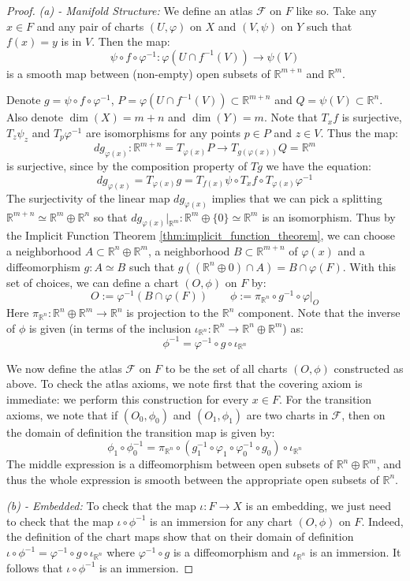 \documentclass[12pt]{article}
\theoremstyle{definition}
\numberwithin{equation}{section}
\newcommand{\R}{{\mathbb R}}
\newcommand{\op}{\operatorname}
\begin{document}
\begin{proof} \emph{(a) - Manifold Structure:} We define an atlas $\mathcal{F}$ on $F$ like so. Take any $x \in F$ and any pair of charts $(U,\varphi)$ on $X$ and $(V,\psi)$ on $Y$ such that $f(x) = y$ is in $V$. Then the map:
\[\psi \circ f \circ \varphi^{-1}:\varphi(U \cap f^{-1}(V)) \to \psi(V)\]
is a smooth map between (non-empty) open subsets of $\R^{m + n}$ and $\R^m$. 

Denote $g = \psi \circ f \circ \varphi^{-1}$, $P = \varphi(U \cap f^{-1}(V)) \subset \R^{m+n}$ and $Q = \psi(V) \subset \R^n$. Also denote $\op{dim}(X) = m + n$ and  $\op{dim}(Y) = m$. Note that $T_xf$ is surjective, $T_z\psi_z$ and $T_p\varphi^{-1}$ are isomorphisms for any points $p \in P$ and $z \in V$. Thus the map:
\[dg_{\varphi(x)}:\R^{m + n} = T_{\varphi(x)}P \to T_{g(\varphi(x))}Q = \R^m\]
is surjective, since by the composition property of $Tg$ we have the equation:
\[dg_{\varphi(x)} = T_{\varphi(x)}g = T_{f(x)}\psi \circ T_xf \circ T_{\varphi(x)}\varphi^{-1}\]
 The surjectivity of the linear map $dg_{\varphi(x)}$ implies that we can pick a splitting $\R^{m+n} \simeq \R^{m} \oplus \R^{n}$ so that $dg_{\varphi(x)}|_{\R^m}:\R^m \oplus \{0\} \simeq \R^m$ is an isomorphism. Thus by the Implicit Function Theorem \ref{thm:implicit_function_theorem}, we can choose a neighborhood $A \subset \R^n \oplus \R^m$, a neighborhood $B \subset \R^{m+n}$ of $\varphi(x)$ and a diffeomorphism $g:A \simeq B$ such that $g((\R^n \oplus 0) \cap A) = B \cap \varphi(F)$. With this set of choices, we can define a chart $(O,\phi)$ on $F$ by:
\[
O := \varphi^{-1}(B \cap \varphi(F)) \qquad \phi := \pi_{\R^n} \circ g^{-1} \circ \varphi|_O
\]
Here $\pi_{\R^n}:\R^n \oplus \R^m \to \R^n$ is projection to the $\R^n$ component. Note that the inverse of $\phi$ is given (in terms of the inclusion $\iota_{\R^n}:\R^n \to \R^n \oplus \R^m$) as:
\[
\phi^{-1} = \varphi^{-1} \circ g \circ \iota_{\R^n}
\]

 We now define the atlas $\mathcal{F}$ on $F$ to be the set of all charts $(O,\phi)$ constructed as above. To check the atlas axioms, we note first that the covering axiom is immediate: we perform this construction for every $x \in F$. For the transition axioms, we note that if $(O_0,\phi_0)$ and $(O_1,\phi_1)$ are two charts in $\mathcal{F}$, then on the domain of definition the transition map is given by:
 \[
 \phi_1 \circ \phi_0^{-1} = \pi_{\mathbb{R}^n} \circ (g_1^{-1} \circ \varphi_1 \circ \varphi_0^{-1} \circ g_0) \circ \iota_{\R^n}
 \]
 The middle expression is a diffeomorphism between open subsets of $\R^n \oplus \R^m$, and thus the whole expression is smooth between the appropriate open subsets of $\R^n$.

\emph{(b) - Embedded:} To check that the map $\iota:F \to X$ is an embedding, we just need to check that the map $\iota \circ \phi^{-1}$ is an immersion for any chart $(O,\phi)$ on $F$. Indeed, the definition of the chart maps show that on their domain of definition $\iota \circ \phi^{-1} = \varphi^{-1} \circ g \circ \iota_{\R^n}$ where $\varphi^{-1} \circ g$ is a diffeomorphism and $\iota_{\R^n}$ is an immersion. It follows that $\iota \circ \phi^{-1}$ is an immersion. \end{proof}
\end{document}
